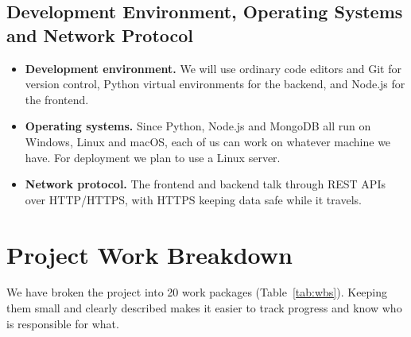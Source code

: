 \documentclass[12pt,a4paper]{report}
\begin{document}
\subsection*{Development Environment, Operating Systems and Network Protocol}
\begin{itemize}
  \item \textbf{Development environment.} We will use ordinary code editors and Git for version control, Python virtual environments for the backend, and Node.js for the frontend.
  \item \textbf{Operating systems.} Since Python, Node.js and MongoDB all run on Windows, Linux and macOS, each of us can work on whatever machine we have. For deployment we plan to use a Linux server.
  \item \textbf{Network protocol.} The frontend and backend talk through REST APIs over HTTP/HTTPS, with HTTPS keeping data safe while it travels.
\end{itemize}

\section{Project Work Breakdown}
We have broken the project into 20 work packages (Table~\ref{tab:wbs}). Keeping them small and clearly described makes it easier to track progress and know who is responsible for what.
\end{document}
